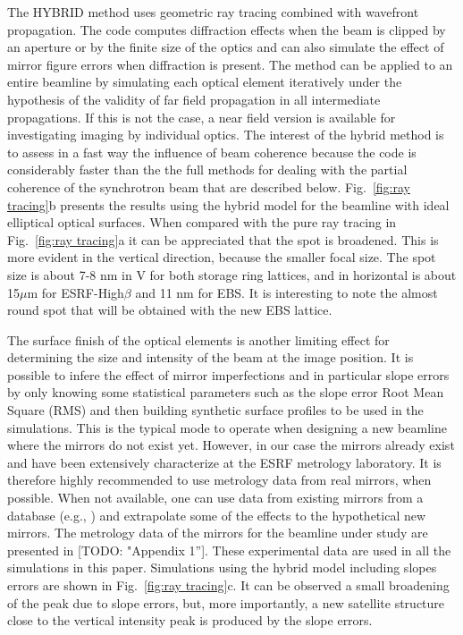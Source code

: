 \documentclass{iucr}              %
\newcommand{\todo}[1]{{\color{red}[TODO: "#1'']}}
\begin{document}
The HYBRID method \cite{hybrid} uses geometric ray tracing combined with wavefront propagation. The code computes diffraction effects when the beam is clipped by an aperture or by the finite size of the optics and can also simulate the effect of mirror figure errors when diffraction is present. The method can be applied to an entire beamline by simulating each optical element iteratively under the hypothesis of the validity of far field propagation in all intermediate propagations. If this is not the case, a near field version is available for investigating imaging by individual optics. The interest of the hybrid method is to assess in a fast way the influence of beam coherence because the code is considerably faster than the the full methods for dealing with the partial coherence of the synchrotron beam that are described below. Fig.~\ref{fig:ray tracing}b presents the results using the hybrid model for the beamline with ideal elliptical optical surfaces. When compared with the pure ray tracing in Fig.~\ref{fig:ray tracing}a it can be appreciated that the spot is broadened. This is more evident in the vertical direction, because the smaller focal size. The spot size is about 7-8 nm in V for both storage ring lattices, and in horizontal is about 15$\mu$m for ESRF-High$\beta$ and 11 nm for EBS. It is interesting to note the almost round spot that will be obtained with the new EBS lattice. 

The surface finish of the optical elements is another limiting effect for determining the size and intensity of the beam at the image position. It is possible to infere the effect of mirror imperfections and in particular slope errors by only knowing some statistical parameters such as the slope error Root Mean Square (RMS) and then building synthetic surface profiles to be used in the simulations. This is the typical mode to operate when designing a new beamline where the mirrors do not exist yet. However, in our case the mirrors already exist and have been extensively characterize at the ESRF metrology laboratory. It is therefore highly recommended to use metrology data from real mirrors, when possible. When not available, one can use data from existing mirrors from a database (e.g., \cite{dabam}) and extrapolate some of the effects to the hypothetical new mirrors. The metrology data of the mirrors for the beamline under study are presented in \todo{Appendix 1}. These experimental data are used in all the simulations in this paper. Simulations using the hybrid model including slopes errors are shown in Fig.~\ref{fig:ray tracing}c. It can be observed a small broadening of the peak due to slope errors, but, more importantly, a new satellite structure close to the vertical intensity peak is produced by the slope errors. 
\end{document}
